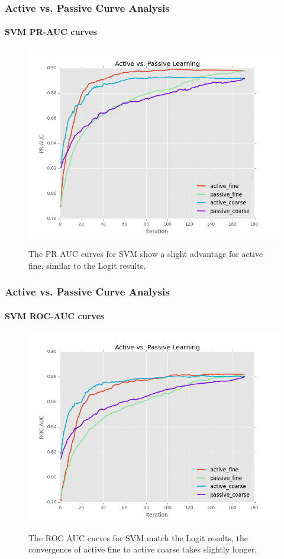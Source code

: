 \documentclass{beamer}
\begin{document}
\begin{frame}
    \frametitle{Active vs. Passive Curve Analysis}
    \framesubtitle{SVM PR-AUC curves}
    \begin{figure}[!htb]
        \centering
        \includegraphics[width=0.80\columnwidth]{fig/runActPassSVM_pr}
        \label{fig:ActiveVsPassivePRSVM}
        \caption{The PR AUC curves for SVM show a slight advantage for active fine,
         similar to the Logit results.}
    \end{figure}
\end{frame}
\begin{frame}
    \frametitle{Active vs. Passive Curve Analysis}
    \framesubtitle{SVM ROC-AUC curves}
    \begin{figure}[!htb]
        \centering
        \includegraphics[width=0.80\columnwidth]{fig/runActPassSVM_roc}
        \label{fig:ActiveVsPassiveROCSVM}
        \caption{The ROC AUC curves for SVM match the Logit results, the convergence of
         active fine to active coarse takes slightly longer.}%
    \end{figure}
\end{frame}
\end{document}
